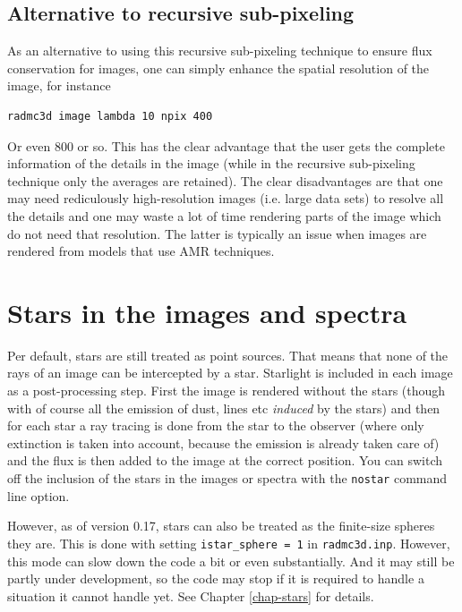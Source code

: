 \documentclass{report}
\begin{document}
\subsection{Alternative to recursive sub-pixeling}
As an alternative to using this recursive sub-pixeling technique to ensure
flux conservation for images, one can simply enhance the spatial resolution
of the image, for instance
{\small\begin{verbatim}
radmc3d image lambda 10 npix 400
\end{verbatim}}
Or even 800 or so. This has the clear advantage that the user gets the complete
information of the details in the image (while in the recursive sub-pixeling
technique only the averages are retained). The clear disadvantages are that
one may need rediculously high-resolution images (i.e. large data sets) to
resolve all the details and one may waste a lot of time rendering parts of
the image which do not need that resolution. The latter is typically an
issue when images are rendered from models that use AMR techniques.




\section{Stars in the images and spectra}
\label{sec-image-stars}
Per default, stars are still treated as point sources. That means that none
of the rays of an image can be intercepted by a star. Starlight is included
in each image as a post-processing step. First the image is rendered without
the stars (though with of course all the emission of dust, lines etc {\em
  induced} by the stars) and then for each star a ray tracing is done from
the star to the observer (where only extinction is taken into account,
because the emission is already taken care of) and the flux is then added to
the image at the correct position. You can switch off the inclusion of the
stars in the images or spectra with the {\small\tt nostar} command line
option.

However, as of version 0.17, stars can also be treated as the finite-size
spheres they are. This is done with setting {\small\tt istar\_sphere = 1} in
{\small\tt radmc3d.inp}. However, this mode can slow down the code a bit or
even substantially. And it may still be partly under development, so the
code may stop if it is required to handle a situation it cannot handle yet.
See Chapter \ref{chap-stars} for details.
\end{document}
